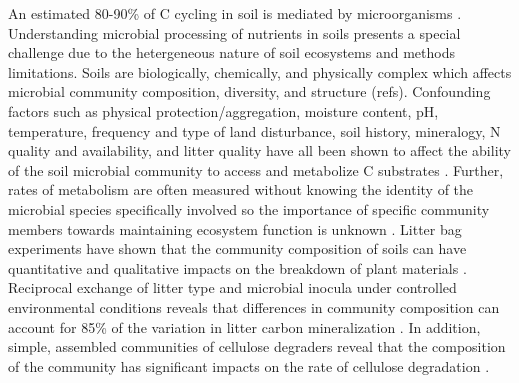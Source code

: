 An estimated 80-90\% of C cycling in soil is mediated by microorganisms \cite{ColemanCrossley_1996,Nannipieri_2003}. Understanding microbial processing of nutrients in soils presents a special challenge due to the hetergeneous nature of soil ecosystems and methods limitations. Soils are biologically, chemically, and physically complex which affects microbial community composition, diversity, and structure (refs). Confounding factors such as physical protection/aggregation, moisture content, pH, temperature, frequency and type of land disturbance, soil history, mineralogy, N quality and availability, and litter quality have all been shown to affect the ability of the soil microbial community to access and metabolize C substrates \cite{Schlesinger_1977,dgett_Wall_Hattenschwiler_2010,Sollins_Homann_Caldwell_1996,Torn_Vitousek_Trumbore_2005,TRUMBORE_2006,Schimel_2012}. Further, rates of metabolism are often measured without knowing the identity of the microbial species specifically involved \cite{ndi_Pietramellara_Renella_2003} so the importance of specific community members towards maintaining ecosystem function is unknown \cite{Allison_2008,ndi_Pietramellara_Renella_2003,Schimel_2012}. Litter bag experiments have shown that the community composition of soils can have quantitative and qualitative impacts on the breakdown of plant materials \cite{Schimel_1995}. Reciprocal exchange of litter type and microbial inocula under controlled environmental conditions reveals that differences in community composition can account for 85\% of the variation in litter carbon mineralization \cite{Strickland_2009}. In addition, simple, assembled communities of cellulose degraders reveal that the composition of the community has significant impacts on the rate of cellulose degradation \cite{Wohl_2004}. 

